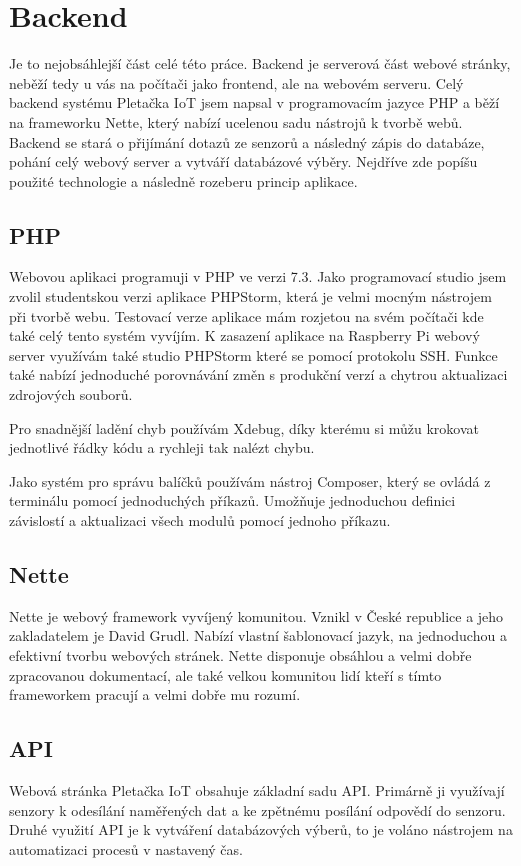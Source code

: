 \section{Backend}
Je to nejobsáhlejší část celé této práce. 
Backend je serverová část webové stránky, neběží tedy u vás na počítači jako frontend, ale na webovém serveru.   
Celý backend systému Pletačka IoT jsem napsal v programovacím jazyce PHP a běží na frameworku Nette\cite{NETTE}, který nabízí ucelenou sadu nástrojů k tvorbě webů.
Backend se stará o přijímání dotazů ze senzorů a následný zápis do databáze, pohání celý webový server a vytváří databázové výběry.
Nejdříve zde popíšu použité technologie a následně rozeberu princip aplikace.

\subsection{PHP}
Webovou aplikaci programuji v PHP ve verzi 7.3. Jako programovací studio jsem zvolil studentskou verzi aplikace PHPStorm, která je velmi mocným nástrojem při tvorbě webu.
Testovací verze aplikace mám rozjetou na svém počítači kde také celý tento systém vyvíjím. K zasazení aplikace na Raspberry Pi webový server využívám také studio PHPStorm které se pomocí protokolu SSH. 
Funkce také nabízí jednoduché porovnávání změn s produkční verzí a chytrou aktualizaci zdrojových souborů.

Pro snadnější ladění chyb používám Xdebug, díky kterému si můžu krokovat jednotlivé řádky kódu a rychleji tak nalézt chybu.

Jako systém pro správu balíčků používám nástroj Composer, který se ovládá z terminálu pomocí jednoduchých příkazů.
Umožňuje jednoduchou definici závislostí a aktualizaci všech modulů pomocí jednoho příkazu.


\subsection{Nette}
Nette je webový framework vyvíjený komunitou. Vznikl v České republice a jeho zakladatelem je David Grudl. 
Nabízí vlastní šablonovací jazyk, na jednoduchou a efektivní tvorbu webových stránek. 
Nette disponuje obsáhlou a velmi dobře zpracovanou dokumentací, ale také velkou komunitou lidí kteří s tímto frameworkem pracují a velmi dobře mu rozumí. 


\subsection{API}
Webová stránka Pletačka IoT obsahuje základní sadu API.
Primárně ji využívají senzory k odesílání naměřených dat a ke zpětnému posílání odpovědí do senzoru.
Druhé využití API je k vytváření databázových výberů, to je voláno nástrojem na automatizaci procesů v nastavený čas. 


